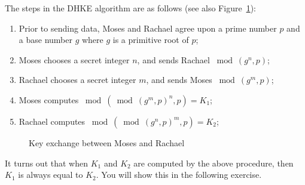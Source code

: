 The steps in the DHKE algorithm are as follows (see also Figure~\ref{fig:DH:DHKE_1}):
 \begin{enumerate}[Step 1.]
 \item Prior to sending data, Moses and Rachael agree upon a prime number $p$ and a base number $g$ where $g$ is a primitive root of $p$; 
\item Moses chooses a secret integer $n$, and sends Rachael $ \bmod (g^n , p)$;
\item Rachael chooses a secret integer $m$, and sends Moses  $ \bmod (g^m , p)$;
\item Moses computes $ \bmod ( \bmod (g^m , p)^n , p ) = K_1$;
\item Rachael computes $ \bmod (\bmod (g^n , p)^m , p ) = K_2$;
\end{enumerate} 
\begin{figure}[htb]
	  \caption{\label{fig:DH:DHKE_1} Key exchange between Moses and Rachael }
\end{figure}
It turns out that when $K_1$ and $K_2$ are computed by the above procedure, then $K_1$ is always equal to $K_2$.  You will show this in the following exercise.

